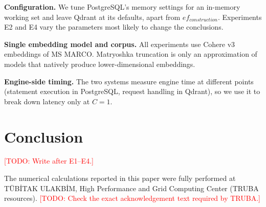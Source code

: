 \documentclass[sigconf, nonacm]{acmart}
\newcommand{\todo}[1]{\textcolor{red}{[TODO: #1]}}
\newcommand{\todo}[1]{\errmessage{Unresolved TODO: #1}}
\begin{document}
\textbf{Configuration.} We tune PostgreSQL's memory settings for an in-memory working
set and leave Qdrant at its defaults, apart from $ef_{construction}$. Experiments E2 and
E4 vary the parameters most likely to change the conclusions.

\textbf{Single embedding model and corpus.} All experiments use Cohere v3 embeddings of
MS MARCO. Matryoshka truncation is only an approximation of models that natively produce
lower-dimensional embeddings.

\textbf{Engine-side timing.} The two systems measure engine time at different points
(statement execution in PostgreSQL, request handling in Qdrant), so we use it to break
down latency only at $C=1$.

\section{Conclusion}

\todo{Write after E1--E4.}

\begin{acks}
The numerical calculations reported in this paper were fully performed at TÜBİTAK
ULAKBİM, High Performance and Grid Computing Center (TRUBA resources).
\todo{Check the exact acknowledgement text required by TRUBA.}
\end{acks}
\end{document}
